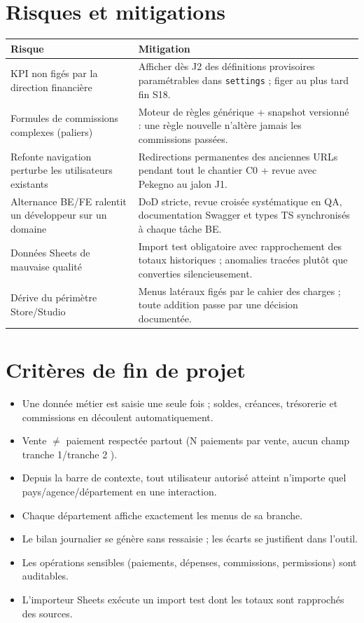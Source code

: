 \documentclass[11pt,a4paper]{article}
\begin{document}
\section{Risques et mitigations}

\begin{tabularx}{\textwidth}{|Y|Y|}
\hline
{}\textbf{Risque} & \textbf{Mitigation} \\ \hline
KPI non figés par la direction financière & Afficher dès J2 des définitions provisoires paramétrables dans \texttt{settings} ; figer au plus tard fin S18. \\ \hline
Formules de commissions complexes (paliers) & Moteur de règles générique + snapshot versionné : une règle nouvelle n'altère jamais les commissions passées. \\ \hline
Refonte navigation perturbe les utilisateurs existants & Redirections permanentes des anciennes URLs pendant tout le chantier C0 + revue avec Pekegno au jalon J1. \\ \hline
Alternance BE/FE ralentit un développeur sur un domaine & DoD stricte, revue croisée systématique en QA, documentation Swagger et types TS synchronisés à chaque tâche BE. \\ \hline
Données Sheets de mauvaise qualité & Import test obligatoire avec rapprochement des totaux historiques ; anomalies tracées plutôt que converties silencieusement. \\ \hline
Dérive du périmètre Store/Studio & Menus latéraux figés par le cahier des charges ; toute addition passe par une décision documentée. \\ \hline
\end{tabularx}

\section{Critères de fin de projet}

\begin{itemize}[nosep]
  \item Une donnée métier est saisie une seule fois ; soldes, créances, trésorerie et commissions en découlent automatiquement.
  \item Vente $\neq$ paiement respectée partout (N paiements par vente, aucun champ \og tranche 1/tranche 2 \fg{}).
  \item Depuis la barre de contexte, tout utilisateur autorisé atteint n'importe quel pays/agence/département en une interaction.
  \item Chaque département affiche exactement les menus de sa branche.
  \item Le bilan journalier se génère sans ressaisie ; les écarts se justifient dans l'outil.
  \item Les opérations sensibles (paiements, dépenses, commissions, permissions) sont auditables.
  \item L'importeur Sheets exécute un import test dont les totaux sont rapprochés des sources.
\end{itemize}
\end{document}

